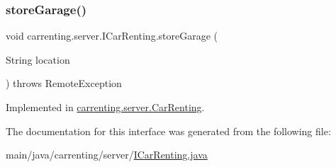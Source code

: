 \mbox{\label{interfacecarrenting_1_1server_1_1_i_car_renting_a2a6b576363c023ef94615f58d7305222}} 
\subsubsection{\texorpdfstring{storeGarage()}{storeGarage()}}
{\footnotesize\ttfamily void carrenting.\+server.\+I\+Car\+Renting.\+store\+Garage (\begin{DoxyParamCaption}\item[{String}]{location }\end{DoxyParamCaption}) throws Remote\+Exception}



Implemented in \mbox{\hyperlink{classcarrenting_1_1server_1_1_car_renting_a00e1951eeaff747c8a601d586b3fb8e9}{carrenting.\+server.\+Car\+Renting}}.



The documentation for this interface was generated from the following file\+:\begin{DoxyCompactItemize}
\item 
main/java/carrenting/server/\mbox{\hyperlink{_i_car_renting_8java}{I\+Car\+Renting.\+java}}\end{DoxyCompactItemize}
